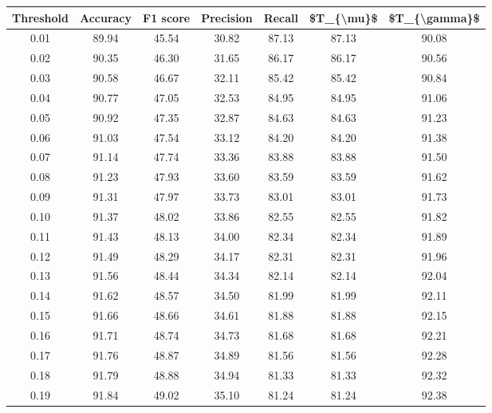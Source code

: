 \begin{tabular}{|c|c|c|c|c|c|c|}
\hline
 Threshold &  Accuracy &  F1 score &  Precision &  Recall &  \$T\_\{\textbackslash mu\}\$ &  \$T\_\{\textbackslash gamma\}\$ \\
\hline
      0.01 &     89.94 &     45.54 &      30.82 &   87.13 &      87.13 &         90.08 \\
      0.02 &     90.35 &     46.30 &      31.65 &   86.17 &      86.17 &         90.56 \\
      0.03 &     90.58 &     46.67 &      32.11 &   85.42 &      85.42 &         90.84 \\
      0.04 &     90.77 &     47.05 &      32.53 &   84.95 &      84.95 &         91.06 \\
      0.05 &     90.92 &     47.35 &      32.87 &   84.63 &      84.63 &         91.23 \\
      0.06 &     91.03 &     47.54 &      33.12 &   84.20 &      84.20 &         91.38 \\
      0.07 &     91.14 &     47.74 &      33.36 &   83.88 &      83.88 &         91.50 \\
      0.08 &     91.23 &     47.93 &      33.60 &   83.59 &      83.59 &         91.62 \\
      0.09 &     91.31 &     47.97 &      33.73 &   83.01 &      83.01 &         91.73 \\
      0.10 &     91.37 &     48.02 &      33.86 &   82.55 &      82.55 &         91.82 \\
      0.11 &     91.43 &     48.13 &      34.00 &   82.34 &      82.34 &         91.89 \\
      0.12 &     91.49 &     48.29 &      34.17 &   82.31 &      82.31 &         91.96 \\
      0.13 &     91.56 &     48.44 &      34.34 &   82.14 &      82.14 &         92.04 \\
      0.14 &     91.62 &     48.57 &      34.50 &   81.99 &      81.99 &         92.11 \\
      0.15 &     91.66 &     48.66 &      34.61 &   81.88 &      81.88 &         92.15 \\
      0.16 &     91.71 &     48.74 &      34.73 &   81.68 &      81.68 &         92.21 \\
      0.17 &     91.76 &     48.87 &      34.89 &   81.56 &      81.56 &         92.28 \\
      0.18 &     91.79 &     48.88 &      34.94 &   81.33 &      81.33 &         92.32 \\
      0.19 &     91.84 &     49.02 &      35.10 &   81.24 &      81.24 &         92.38 \\

\end{tabular}
